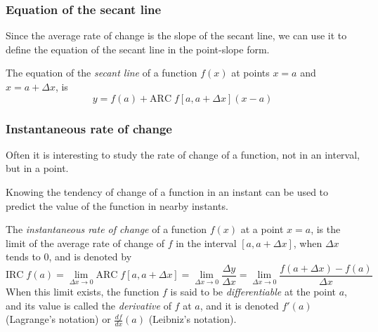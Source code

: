 \begin{frame}
	\frametitle{Equation of the secant line}
  Since the average rate of change is the slope of the secant line, we can use it to define the equation of the secant line in the point-slope form.
  	  
	\begin{definition}
    The equation of the \emph{secant line} of a function $f(x)$ at points $x=a$ and $x=a+\Delta x$, is 
    \[
			y=f(a)+\mbox{ARC}\;f[a,a+\Delta x](x-a) 
		\]
	\end{definition}
\end{frame}
  

\begin{frame}
	\frametitle{Instantaneous rate of change}
	Often it is interesting to study the rate of change of a function, not in an interval, but in a point.
	
	Knowing the tendency of change of a function in an instant can be used to predict the value of the function in nearby instants.
	
	\begin{definition}
		The \emph{instantaneous rate of change} of a function $f(x)$ at a point $x=a$, is the limit of the average rate of change of $f$ in the interval $[a,a+\Delta x]$, when $\Delta x$ tends to 0, and is denoted by
		\[
			\mbox{IRC}\;f (a)=\lim_{\Delta x\rightarrow 0} \mbox{ARC}\; f[a,a+\Delta x]=\lim_{\Delta x\rightarrow 0}\frac{\Delta y}{\Delta x}=\lim_{\Delta x\rightarrow 0}\frac{f(a+\Delta x)-f(a)}{\Delta x}
		\]
		When this limit exists, the function $f$ is said to be \emph{differentiable} at the point $a$, and its value is called the \emph{derivative} of $f$ at $a$, and it is denoted $f'(a)$ (Lagrange's notation) or $\frac{df}{dx}(a)$ (Leibniz's notation).
	\end{definition}
\end{frame}


